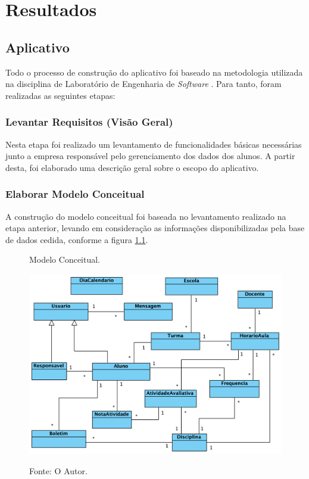 \chapter{\textbf{Resultados}} %
\sloppy %

\section{Aplicativo}

Todo o processo de construção do aplicativo foi baseado na metodologia utilizada na disciplina de Laboratório de Engenharia de \textit{Software} \cite{rupLes}. Para tanto, foram realizadas as seguintes etapas:

\subsection{Levantar Requisitos (Visão Geral)}

Nesta etapa foi realizado um levantamento de funcionalidades básicas necessárias junto a empresa responsável pelo gerenciamento dos dados dos alunos. A partir desta, foi elaborado uma descrição geral sobre o escopo do aplicativo.

\subsection{Elaborar Modelo Conceitual}

A construção do modelo conceitual foi baseada no levantamento realizado na etapa anterior, levando em consideração as informações disponibilizadas pela base de dados cedida, conforme a figura \ref{figura:modelo_conceitual}.

\begin{figure}[H]
	\caption{Modelo Conceitual.}
	\centering %
	\includegraphics[width=13.5cm]{resources/modelo_conceitual.png} %
	\label{figura:modelo_conceitual}
	\captionsetup{singlelinecheck = false, format= hang, justification=raggedright, labelsep=space, width=13.7cm}
	\caption*{\footnotesize Fonte: O Autor.}
\end{figure}

